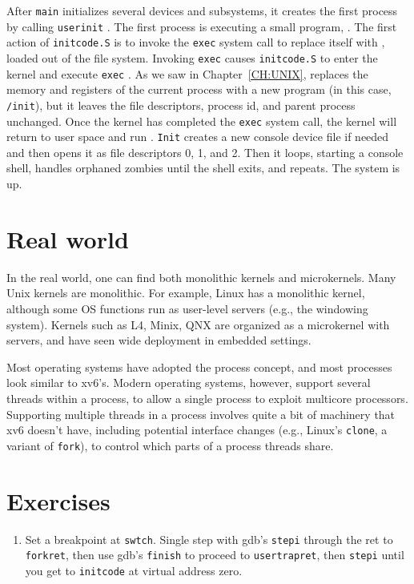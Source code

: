 After
\lstinline{main}
initializes several devices and subsystems, 
it creates the first process by calling 
\lstinline{userinit}
.
The first process is executing a small program,
.
The first action of 
\lstinline{initcode.S}
is to invoke  the
\lstinline{exec}
system call to replace itself with
,
loaded out of the file system.
Invoking
\lstinline{exec}
causes
\lstinline{initcode.S}
to enter the kernel and execute
\lstinline{exec}
.
As we saw in Chapter~\ref{CH:UNIX}, 
replaces the memory and registers of the
current process with a new program (in this case,
\lstinline{/init}),
but it leaves the
file descriptors, process id, and parent process unchanged.
Once the kernel has completed the
\lstinline{exec}
system call, the kernel will return to user space and run
.
\lstinline{Init}
creates a new console device file
if needed
and then opens it as file descriptors 0, 1, and 2.
Then it loops,
starting a console shell, 
handles orphaned zombies until the shell exits,
and repeats.
The system is up.
\section{Real world}

In the real world, one can find both monolithic kernels and microkernels. Many
Unix kernels are monolithic. For example, Linux has a monolithic kernel,
although some OS functions run as user-level servers (e.g., the windowing
system).  Kernels such as L4, Minix, QNX are organized as a microkernel with
servers, and have seen wide deployment in embedded settings.

Most operating systems have adopted the process concept, and most
processes look similar to xv6's.  Modern operating systems, however,
support several threads within a process, to allow a single process to
exploit multicore processors.  Supporting multiple threads in a
process involves quite a bit of machinery that xv6 doesn't have,
including potential interface changes (e.g., Linux's
\lstinline{clone},
a variant of
\lstinline{fork}),
to control which parts of
a process threads share.
\section{Exercises}

\begin{enumerate}
  
\item Set a breakpoint at \lstinline{swtch}.  Single step with gdb's
\lstinline{stepi}
through the ret to
\lstinline{forkret},
then use gdb's
\lstinline{finish}
to proceed to
\lstinline{usertrapret},
then
\lstinline{stepi}
until you get to
\lstinline{initcode} 
at virtual address zero.

\end{enumerate}
